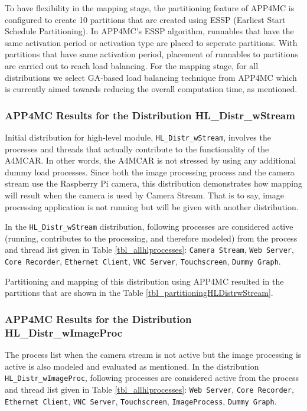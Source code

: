 To have flexibility in the mapping stage, the partitioning feature of APP4MC is configured to create 10 partitions that are created using ESSP (Earliest Start Schedule Partitioning). In APP4MC's ESSP algorithm, runnables that have the same activation period or activation type are placed to seperate partitions. With partitions that have same activation period, placement of runnables to partitions are carried out to reach load balancing. For the mapping stage, for all distributions we select GA-based load balancing technique from APP4MC which is currently aimed towards reducing the overall computation time, as mentioned.

\allhlprocesses

\subsubsection{APP4MC Results for the Distribution HL{\_}Distr{\_}wStream}

Initial distribution for high-level module, \texttt{HL{\_}Distr{\_}wStream}, involves the processes and threads that actually contribute to the functionality of the A4MCAR. In other words, the A4MCAR is not stressed by using any additional dummy load processes. Since both the image processing process and the camera stream use the Raspberry Pi camera, this distribution demonstrates how mapping will result when the camera is used by Camera Stream. That is to say, image processing application is not running but will be given with another distribution. 

In the \texttt{HL{\_}Distr{\_}wStream} distribution, following processes are considered active (running, contributes to the processing, and therefore modeled) from the process and thread list given in Table \ref{tbl_allhlprocesses}: \texttt{Camera Stream}, \texttt{Web Server}, \texttt{Core Recorder}, \texttt{Ethernet Client}, \texttt{VNC Server}, \texttt{Touchscreen}, \texttt{Dummy Graph}.

Partitioning and mapping of this distribution using APP4MC resulted in the partitions that are shown in the Table \ref{tbl_partitioningHLDistrwStream}.

\partitioningHLDistrwStream

\subsubsection{APP4MC Results for the Distribution HL{\_}Distr{\_}wImageProc}

The process list when the camera stream is not active but the image processing is active is also modeled and evaluated as mentioned. In the distribution \texttt{HL{\_}Distr{\_}wImageProc}, following processes are considered active from the process and thread list given in Table \ref{tbl_allhlprocesses}: \texttt{Web Server}, \texttt{Core Recorder}, \texttt{Ethernet Client}, \texttt{VNC Server}, \texttt{Touchscreen}, \texttt{ImageProcess}, \texttt{Dummy Graph}.

